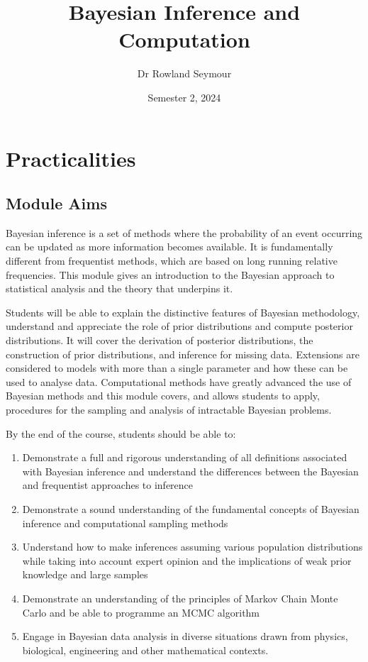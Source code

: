 \documentclass[
]{book}
\title{Bayesian Inference and Computation}
\author{Dr Rowland Seymour}
\date{Semester 2, 2024}
\providecommand{\tightlist}{%
  \setlength{\itemsep}{0pt}\setlength{\parskip}{0pt}}
\theoremstyle{definition}
\theoremstyle{definition}
\theoremstyle{definition}
\theoremstyle{definition}
\theoremstyle{remark}
\begin{document}
\maketitle

{
\setcounter{tocdepth}{1}
\tableofcontents
}
\hypertarget{practicalities}{%
\chapter*{Practicalities}\label{practicalities}}

\hypertarget{module-aims}{%
\section{Module Aims}\label{module-aims}}

Bayesian inference is a set of methods where the probability of an event
occurring can be updated as more information becomes available. It is
fundamentally different from frequentist methods, which are based on
long running relative frequencies. This module gives an introduction to
the Bayesian approach to statistical analysis and the theory that
underpins it.

Students will be able to explain the distinctive features of Bayesian
methodology, understand and appreciate the role of prior distributions
and compute posterior distributions. It will cover the derivation of
posterior distributions, the construction of prior distributions, and
inference for missing data. Extensions are considered to models with
more than a single parameter and how these can be used to analyse data.
Computational methods have greatly advanced the use of Bayesian methods
and this module covers, and allows students to apply, procedures for the
sampling and analysis of intractable Bayesian problems.

By the end of the course, students should be able to:

\begin{enumerate}
\def\labelenumi{\arabic{enumi}.}
\tightlist
\item
  Demonstrate a full and rigorous understanding of all definitions
  associated with Bayesian inference and understand the differences
  between the Bayesian and frequentist approaches to inference
\item
  Demonstrate a sound understanding of the fundamental concepts of
  Bayesian inference and computational sampling methods
\item
  Understand how to make inferences assuming various population
  distributions while taking into account expert opinion and the
  implications of weak prior knowledge and large samples
\item
  Demonstrate an understanding of the principles of Markov Chain Monte
  Carlo and be able to programme an MCMC algorithm
\item
  Engage in Bayesian data analysis in diverse situations drawn from
  physics, biological, engineering and other mathematical contexts.
\end{enumerate}
\end{document}
